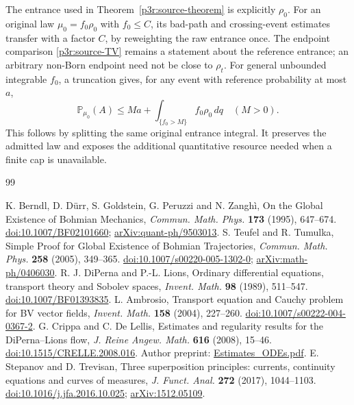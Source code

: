\documentclass[11pt]{article}
\numberwithin{equation}{section}
\theoremstyle{definition}
\theoremstyle{remark}
\begin{document}
The entrance used in Theorem~\ref{p3r:source-theorem} is explicitly $\rho_0$. For an original law $\mu_0=f_0\rho_0$ with $f_0\le C$, its bad-path and crossing-event estimates transfer with a factor $C$, by reweighting the raw entrance once. The endpoint comparison \eqref{p3r:source-TV} remains a statement about the reference entrance; an arbitrary non-Born endpoint need not be close to $\rho_t$. For general unbounded integrable $f_0$, a truncation gives, for any event with reference probability at most $a$,
\[
 \mathbb P_{\mu_0}(A)\le M a+\int_{\{f_0>M\}}f_0\rho_0\,dq
 \quad(M>0).
\]
This follows by splitting the same original entrance integral. It preserves the admitted law and exposes the additional quantitative resource needed when a finite cap is unavailable.

\clearpage
\begin{thebibliography}{99}
\raggedright
{} K. Berndl, D. D\"urr, S. Goldstein, G. Peruzzi and N. Zangh\`i, On the Global Existence of Bohmian Mechanics, \emph{Commun. Math. Phys.} \textbf{173} (1995), 647--674. \href{https://doi.org/10.1007/BF02101660}{doi:10.1007/BF02101660}; \href{https://arxiv.org/abs/quant-ph/9503013}{arXiv:quant-ph/9503013}.
 S. Teufel and R. Tumulka, Simple Proof for Global Existence of Bohmian Trajectories, \emph{Commun. Math. Phys.} \textbf{258} (2005), 349--365. \href{https://doi.org/10.1007/s00220-005-1302-0}{doi:10.1007/s00220-005-1302-0}; \href{https://arxiv.org/abs/math-ph/0406030}{arXiv:math-ph/0406030}.
 R. J. DiPerna and P.-L. Lions, Ordinary differential equations, transport theory and Sobolev spaces, \emph{Invent. Math.} \textbf{98} (1989), 511--547. \href{https://doi.org/10.1007/BF01393835}{doi:10.1007/BF01393835}.
 L. Ambrosio, Transport equation and Cauchy problem for BV vector fields, \emph{Invent. Math.} \textbf{158} (2004), 227--260. \href{https://doi.org/10.1007/s00222-004-0367-2}{doi:10.1007/s00222-004-0367-2}.
 G. Crippa and C. De Lellis, Estimates and regularity results for the DiPerna--Lions flow, \emph{J. Reine Angew. Math.} \textbf{616} (2008), 15--46. \href{https://doi.org/10.1515/CRELLE.2008.016}{doi:10.1515/CRELLE.2008.016}. Author preprint: \href{https://www.math.ias.edu/delellis/sites/math.ias.edu.delellis/files/Estimates_ODEs.pdf}{Estimates\_ODEs.pdf}.
 E. Stepanov and D. Trevisan, Three superposition principles: currents, continuity equations and curves of measures, \emph{J. Funct. Anal.} \textbf{272} (2017), 1044--1103. \href{https://doi.org/10.1016/j.jfa.2016.10.025}{doi:10.1016/j.jfa.2016.10.025}; \href{https://arxiv.org/abs/1512.05109}{arXiv:1512.05109}.

\end{thebibliography}
\end{document}
